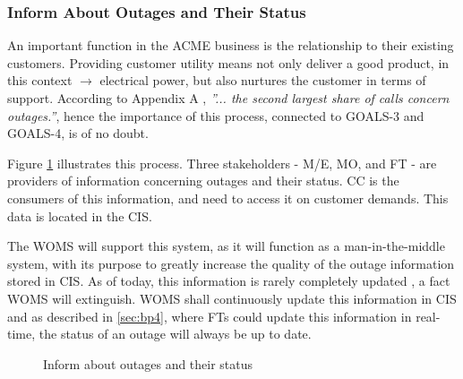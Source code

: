 \subsubsection{Inform About Outages and Their Status}
\label{sec:bp5}
An important function in the ACME business is the relationship to their existing customers. Providing customer utility means not only deliver a good product, in this context $\rightarrow$ electrical power, but also nurtures the customer in terms of support. According to Appendix A \cite{A}, \emph{''... the second largest share of calls concern outages.''}, hence the importance of this process, connected to GOALS-3 and GOALS-4, is of no doubt. 

Figure \ref{fig:inform} illustrates this process. Three stakeholders - M/E, MO, and FT - are providers of information concerning outages and their status. CC is the consumers of this information, and need to access it on customer demands. This data is located in the CIS.

The WOMS will support this system, as it will function as a man-in-the-middle system, with its purpose to greatly increase the quality of the outage information stored in CIS. As of today, this information is rarely completely updated \cite{A}, a fact WOMS will extinguish. WOMS shall continuously update this information in CIS and as described in \ref{sec:bp4}, where FTs could update this information in real-time, the status of an outage will always be up to date. 
\begin{figure}[H]
	\centering
	\setlength\fboxsep{7pt}
	\setlength\fboxrule{0.5pt}
	\label{fig:inform}
	\caption{Inform about outages and their status}
\end{figure}
%
